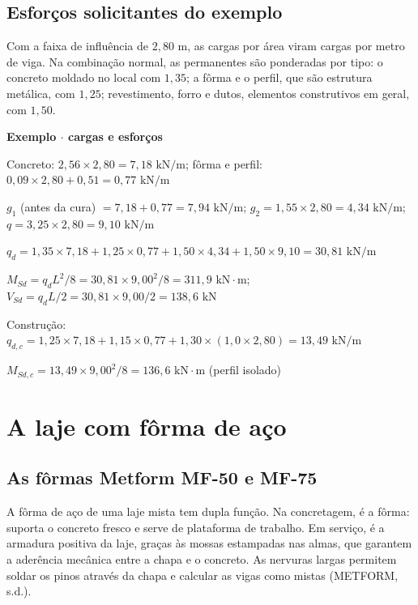 \documentclass[11pt,a4paper]{article}
\newcommand{\caixaexemplo}[2]{%
  \par\vspace{6pt}\noindent\colorbox{examplebg}{%
    \parbox{\dimexpr\linewidth-2\fboxsep\relax}{%
      \vspace{4pt}\textbf{\color{exampleaccent}#1}\par\vspace{3pt}#2\vspace{4pt}%
    }%
  }\par\vspace{6pt}%
}
\begin{document}
\subsection{Esforços solicitantes do exemplo}

Com a faixa de influência de $2{,}80\text{ m}$, as cargas por área viram cargas por metro de viga. Na combinação normal, as permanentes são ponderadas por tipo: o concreto moldado no local com $1{,}35$; a fôrma e o perfil, que são estrutura metálica, com $1{,}25$; revestimento, forro e dutos, elementos construtivos em geral, com $1{,}50$.

\caixaexemplo{Exemplo $\cdot$ cargas e esforços}{%
Concreto: $2{,}56 \times 2{,}80 = 7{,}18\text{ kN/m}$; fôrma e perfil: $0{,}09 \times 2{,}80 + 0{,}51 = 0{,}77\text{ kN/m}$\par
$g_1$ (antes da cura) $= 7{,}18 + 0{,}77 = 7{,}94\text{ kN/m}$; $g_2 = 1{,}55 \times 2{,}80 = 4{,}34\text{ kN/m}$; $q = 3{,}25 \times 2{,}80 = 9{,}10\text{ kN/m}$\par
$q_d = 1{,}35 \times 7{,}18 + 1{,}25 \times 0{,}77 + 1{,}50 \times 4{,}34 + 1{,}50 \times 9{,}10 = 30{,}81\text{ kN/m}$\par
$M_{Sd} = q_d L^2/8 = 30{,}81 \times 9{,}00^2/8 = 311{,}9\text{ kN}\cdot\text{m}$; $V_{Sd} = q_d L/2 = 30{,}81 \times 9{,}00/2 = 138{,}6\text{ kN}$\par\vspace{3pt}
Construção: $q_{d,c} = 1{,}25 \times 7{,}18 + 1{,}15 \times 0{,}77 + 1{,}30 \times (1{,}0 \times 2{,}80) = 13{,}49\text{ kN/m}$\par
$M_{Sd,c} = 13{,}49 \times 9{,}00^2/8 = 136{,}6\text{ kN}\cdot\text{m}$ (perfil isolado)}

\section{A laje com fôrma de aço}

\subsection{As fôrmas Metform MF-50 e MF-75}

A fôrma de aço de uma laje mista tem dupla função. Na concretagem, é a fôrma: suporta o concreto fresco e serve de plataforma de trabalho. Em serviço, é a armadura positiva da laje, graças às mossas estampadas nas almas, que garantem a aderência mecânica entre a chapa e o concreto. As nervuras largas permitem soldar os pinos através da chapa e calcular as vigas como mistas (METFORM, s.d.).
\end{document}
